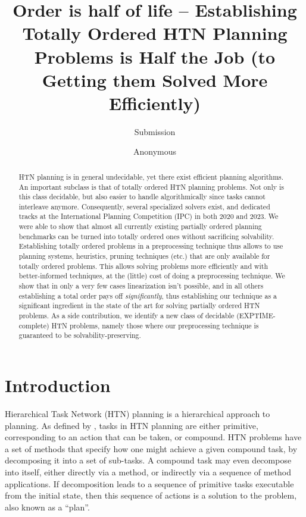 \documentclass[letterpaper]{article} %
\author {
    Submission
}
\author {
    Anonymous

}
\title{Order is half of life -- Establishing Totally Ordered HTN
	Planning Problems is Half the Job (to Getting them Solved More Efficiently)}
\begin{document}
\maketitle

\begin{abstract} 
HTN planning is in general undecidable, yet there exist efficient
planning algorithms. An important subclass is that of totally ordered
HTN planning problems. Not only is this class decidable, but also easier
to handle algorithmically since tasks cannot interleave anymore.
Consequently, several specialized solvers exist, and dedicated tracks at
the International Planning Competition (IPC) in both 2020 and 2023. We
were able to show that almost all currently existing partially ordered
planning benchmarks can be turned into totally ordered ones without
sacrificing solvability. Establishing totally ordered problems in a
preprocessing technique thus allows to use planning systems, heuristics,
pruning techniques (etc.) that are only available for totally ordered
problems. This allows solving problems more efficiently and with
better-informed techniques, at the (little) cost of doing a
preprocessing technique. We show that in only a very few cases
linearization isn't possible, and in all others establishing a total
order pays off \emph{significantly}, thus establishing our technique as
a significant ingredient in the state of the art for solving partially
ordered HTN problems. As a side contribution, we identify a new class of
decidable (EXPTIME-complete) HTN problems, namely those where our
preprocessing technique is guaranteed to be solvability-preserving.
\end{abstract}
 
 

 
 
 
\section{Introduction}
Hierarchical Task Network (HTN) planning is a hierarchical approach to planning. As defined by \cite{HTNSurvey},  %
tasks in HTN planning are either primitive, corresponding to an action that can be taken, or compound. HTN problems have a set of methods that specify how one might achieve a given compound task, by decomposing it into a set of sub-tasks. A compound task may even decompose into itself, either directly via a method, or indirectly via a sequence of method applications. If decomposition leads to a sequence of primitive tasks executable from the initial state, then this sequence of actions is a solution to the problem, also known as a \enquote{plan}. 
\end{document}
